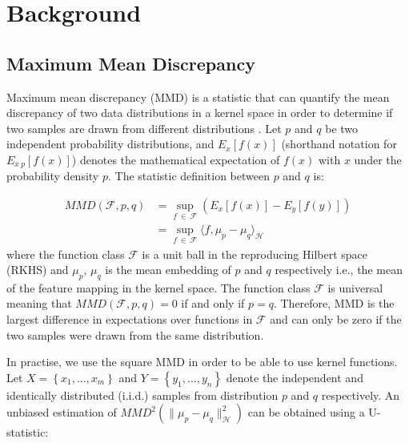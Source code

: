 \documentclass{mpaper}
\begin{document}
\section{Background}

\subsection{Maximum Mean Discrepancy}\label{chap2:MMD}

Maximum mean discrepancy (MMD) is a statistic that can quantify the mean discrepancy of two data distributions in a kernel space in order to determine if two samples are drawn from different distributions \cite{OriginalMMD}. Let $p$ and $q$ be two independent probability distributions, and $E_x\left[f\left(x\right)\right]$ (shorthand notation for $E_{x~p}\left[f\left(x\right)\right]$) denotes the mathematical expectation of $f\left(x\right)$ with $x$ under the probability density $p$. The statistic definition between $p$ and $q$ is:

\begin{equation}
\begin{aligned}
    	MMD\left( \boldsymbol{\mathcal{F}},p, q \right) & = \sup_{f\ \in\ \boldsymbol{\mathcal{F}}} {\left( E_x \left[ f\left( x \right) \right] -E_y \left[ f \left( y \right) \right] \right)} \\
    	& = {\sup_{f\ \in\ \boldsymbol{\mathcal{F}}}{\langle f,\mu_p-\mu_q\rangle_{\boldsymbol{\mathcal{H}}}}}
\end{aligned}
\end{equation}
where the function class $\boldsymbol{\mathcal{F}}$ is a unit ball in the reproducing Hilbert space (RKHS) and $\mu_p$, $\mu_q$ is the mean embedding of $p$ and $q$ respectively i.e., the mean of the feature mapping in the kernel space. The function class $\boldsymbol{\mathcal{F}}$ is universal meaning that $MMD\left(\boldsymbol{\mathcal{F}},p,q\right)=0$ if and only if $p=q$. Therefore, MMD is the largest difference in expectations over functions in $\boldsymbol{\mathcal{F}}$ and can only be zero if the two samples were drawn from the same distribution.

In practise, we use the square MMD in order to be able to use kernel functions. Let $X=\left\{x_1,...,x_m\right\}$ and $Y=\left\{y_1,...,y_n\right\}$ denote the independent and identically distributed (i.i.d.) samples from distribution $p$ and $q$ respectively. An unbiased estimation of $MMD^2 \left( \parallel{\mu_p-\mu_q}\parallel^2_{\boldsymbol{\mathcal{H}}} \right)$ can be obtained using a U-statistic:
\end{document}
